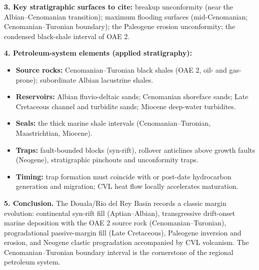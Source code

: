 \documentclass[11pt]{article}
\begin{document}
\begin{exoresolu}
\textbf{3. Key stratigraphic surfaces to cite:} breakup unconformity (near the Albian--Cenomanian transition); maximum flooding surfaces (mid-Cenomanian; Cenomanian--Turonian boundary); the Paleogene erosion unconformity; the condensed black-shale interval of OAE 2.

\textbf{4. Petroleum-system elements (applied stratigraphy):}
\begin{itemize}
    \item \textbf{Source rocks:} Cenomanian--Turonian black shales (OAE 2, oil- and gas-prone); subordinate Albian lacustrine shales.
    \item \textbf{Reservoirs:} Albian fluvio-deltaic sands; Cenomanian shoreface sands; Late Cretaceous channel and turbidite sands; Miocene deep-water turbidites.
    \item \textbf{Seals:} the thick marine shale intervals (Cenomanian--Turonian, Maastrichtian, Miocene).
    \item \textbf{Traps:} fault-bounded blocks (syn-rift), rollover anticlines above growth faults (Neogene), stratigraphic pinchouts and unconformity traps.
    \item \textbf{Timing:} trap formation must coincide with or post-date hydrocarbon generation and migration; CVL heat flow locally accelerates maturation.
\end{itemize}

\textbf{5. Conclusion.} The Douala/Rio del Rey Basin records a classic margin evolution: continental syn-rift fill (Aptian--Albian), transgressive drift-onset marine deposition with the OAE 2 source rock (Cenomanian--Turonian), progradational passive-margin fill (Late Cretaceous), Paleogene inversion and erosion, and Neogene clastic progradation accompanied by CVL volcanism. The Cenomanian--Turonian boundary interval is the cornerstone of the regional petroleum system.
\end{exoresolu}
\end{document}
